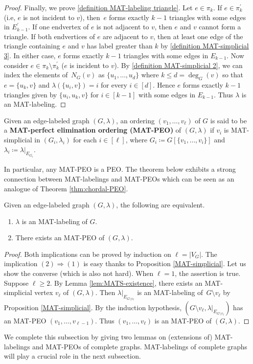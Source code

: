 \begin{proof}
Finally, we prove \ref{definition MAT-labeling triangle}. 
Let $ e \in \pi_{k} $.
If $ e \in \pi_{k}^{\prime} $ (i.e, $ e $ is not incident to $ v $), then~$ e $ forms exactly $ k-1 $ triangles with some edges in $ E_{k-1}^{\prime} $. 
If one endvertex of $ e $ is not adjacent to $ v $, then $ e $ and $v$ cannot form a triangle. 
If both endvertices of $ e $ are adjacent to $ v $, then at least one edge of the triangle containing $ e $ and $ v $ has label greater than $ k $ by \ref{definition MAT-simplicial 3}. 
In either case, $ e $ forms exactly $ k-1 $ triangles with some edges in $ E_{k-1} $. 
Now consider  $ e \in \pi_{k} \setminus \pi_{k}^{\prime} $ (\ie  $ e $ is incident to $ v $). 
By  \ref{definition MAT-simplicial 2}, we can index the elements of~$ N_{G}(v)$  as $\{u_{1}, \dots, u_{d}\} $  where $k\le d=\deg_G(v)$ so that $ e = \{u_{k}, v\} $ and $ \lambda(\{u_{i}, v\}) = i $ for every $ i \in [d] $. 
Hence $ e $ forms exactly $ k-1 $ triangles given by $ \{u_{i}, u_{k}, v\} $ for $ i \in [k-1] $ with some edges in $ E_{k-1} $.  
Thus $ \lambda $ is an MAT-labeling.  
\end{proof}

\begin{definition}
Given an edge-labeled graph $ (G,\lambda) $, an ordering $ (v_{1}, \dots, v_{\ell}) $ of $ G $ is said to be a \textbf{MAT-perfect elimination ordering (MAT-PEO)} of $ (G,\lambda) $ if $ v_{i} $ is MAT-simplicial in $ (G_{i}, \lambda_{i}) $ for each $ i \in [\ell] $, where $ G_{i} \coloneqq G[\{v_{1}, \dots, v_{i}\}] $ and $ \lambda_{i} \coloneqq \lambda|_{E_{G_{i}}} $. 
\end{definition}

In particular, any MAT-PEO is a PEO.
The theorem below exhibits a strong connection between MAT-labelings and MAT-PEOs which can be seen as an analogue of Theorem \ref{thm:chordal-PEO}.
\begin{theorem}
\label{MAT-labeling ordering}
Given an edge-labeled graph $ (G, \lambda) $, the following are equivalent. 
\begin{enumerate}[(1)]
\item $ \lambda $ is an MAT-labeling of $ G $. 
\item There exists an MAT-PEO of $ (G, \lambda) $. 
\end{enumerate}
\end{theorem}
\begin{proof}
Both implications can be proved by induction on $ \ell = |V_{G}| $.
The implication $ (2) \Rightarrow (1) $ is easy thanks to Proposition \ref{MAT-simplicial}. 
Let us show the converse (which is also not hard). 
When $ \ell = 1 $, the assertion is true.
Suppose $ \ell \geq 2 $. 
By Lemma \ref{lem:MATS-existence}, there exists an MAT-simplicial vertex $ v_{\ell} $ of $ (G, \lambda) $. 
Then $ \lambda|_{E_{G\setminus v_{\ell}}} $ is an MAT-labeling of~$ G\setminus v_{\ell} $ by Proposition \ref{MAT-simplicial}. 
By the induction hypothesis, $ (G\setminus v_{\ell}, \lambda|_{E_{G\setminus v_{\ell}}}) $ has an MAT-PEO $ (v_{1}, \dots, v_{\ell -1}) $. 
Thus $ (v_{1}, \dots, v_{\ell}) $ is an MAT-PEO of $ (G,\lambda) $. 
\end{proof}

We complete this subsection by giving two lemmas on (extensions of) MAT-labelings and MAT-PEOs of complete graphs. 
MAT-labelings of complete graphs will play a crucial role in the next subsection. 
